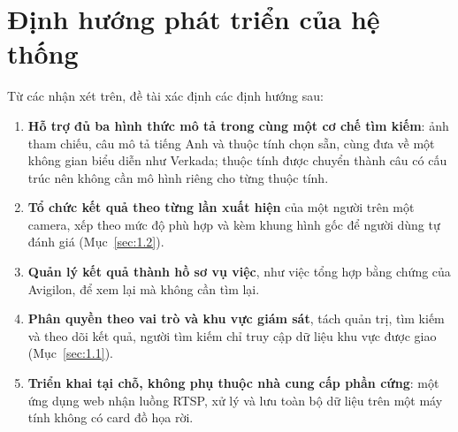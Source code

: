 \section{Định hướng phát triển của hệ thống}
\label{sec:2.3}

Từ các nhận xét trên, đề tài xác định các định hướng sau:
\begin{enumerate}
    \item \textbf{Hỗ trợ đủ ba hình thức mô tả trong cùng một cơ chế tìm kiếm}: ảnh tham chiếu, câu mô tả tiếng Anh và thuộc tính chọn sẵn, cùng đưa về một không gian biểu diễn như Verkada; thuộc tính được chuyển thành câu có cấu trúc nên không cần mô hình riêng cho từng thuộc tính.
    \item \textbf{Tổ chức kết quả theo từng lần xuất hiện} của một người trên một camera, xếp theo mức độ phù hợp và kèm khung hình gốc để người dùng tự đánh giá (Mục~\ref{sec:1.2}).
    \item \textbf{Quản lý kết quả thành hồ sơ vụ việc}, như việc tổng hợp bằng chứng của Avigilon, để xem lại mà không cần tìm lại.
    \item \textbf{Phân quyền theo vai trò và khu vực giám sát}, tách quản trị, tìm kiếm và theo dõi kết quả, người tìm kiếm chỉ truy cập dữ liệu khu vực được giao (Mục~\ref{sec:1.1}).
    \item \textbf{Triển khai tại chỗ, không phụ thuộc nhà cung cấp phần cứng}: một ứng dụng web nhận luồng RTSP, xử lý và lưu toàn bộ dữ liệu trên một máy tính không có card đồ họa rời.
    \end{enumerate}
